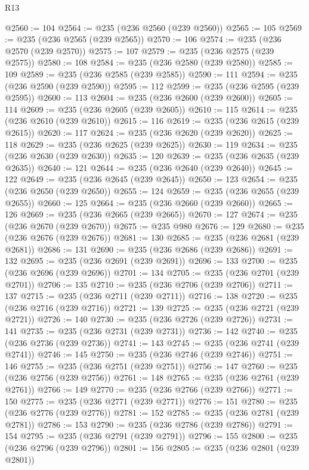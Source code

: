 \begin{lexlean}{R13}
\begin{coremodule}
@2560 := 104
@2564 := @235 (@236 @2560 (@239 @2560))
@2565 := 105
@2569 := @235 (@236 @2565 (@239 @2565))
@2570 := 106
@2574 := @235 (@236 @2570 (@239 @2570))
@2575 := 107
@2579 := @235 (@236 @2575 (@239 @2575))
@2580 := 108
@2584 := @235 (@236 @2580 (@239 @2580))
@2585 := 109
@2589 := @235 (@236 @2585 (@239 @2585))
@2590 := 111
@2594 := @235 (@236 @2590 (@239 @2590))
@2595 := 112
@2599 := @235 (@236 @2595 (@239 @2595))
@2600 := 113
@2604 := @235 (@236 @2600 (@239 @2600))
@2605 := 114
@2609 := @235 (@236 @2605 (@239 @2605))
@2610 := 115
@2614 := @235 (@236 @2610 (@239 @2610))
@2615 := 116
@2619 := @235 (@236 @2615 (@239 @2615))
@2620 := 117
@2624 := @235 (@236 @2620 (@239 @2620))
@2625 := 118
@2629 := @235 (@236 @2625 (@239 @2625))
@2630 := 119
@2634 := @235 (@236 @2630 (@239 @2630))
@2635 := 120
@2639 := @235 (@236 @2635 (@239 @2635))
@2640 := 121
@2644 := @235 (@236 @2640 (@239 @2640))
@2645 := 122
@2649 := @235 (@236 @2645 (@239 @2645))
@2650 := 123
@2654 := @235 (@236 @2650 (@239 @2650))
@2655 := 124
@2659 := @235 (@236 @2655 (@239 @2655))
@2660 := 125
@2664 := @235 (@236 @2660 (@239 @2660))
@2665 := 126
@2669 := @235 (@236 @2665 (@239 @2665))
@2670 := 127
@2674 := @235 (@236 @2670 (@239 @2670))
@2675 := @235 @980
@2676 := 129
@2680 := @235 (@236 @2676 (@239 @2676))
@2681 := 130
@2685 := @235 (@236 @2681 (@239 @2681))
@2686 := 131
@2690 := @235 (@236 @2686 (@239 @2686))
@2691 := 132
@2695 := @235 (@236 @2691 (@239 @2691))
@2696 := 133
@2700 := @235 (@236 @2696 (@239 @2696))
@2701 := 134
@2705 := @235 (@236 @2701 (@239 @2701))
@2706 := 135
@2710 := @235 (@236 @2706 (@239 @2706))
@2711 := 137
@2715 := @235 (@236 @2711 (@239 @2711))
@2716 := 138
@2720 := @235 (@236 @2716 (@239 @2716))
@2721 := 139
@2725 := @235 (@236 @2721 (@239 @2721))
@2726 := 140
@2730 := @235 (@236 @2726 (@239 @2726))
@2731 := 141
@2735 := @235 (@236 @2731 (@239 @2731))
@2736 := 142
@2740 := @235 (@236 @2736 (@239 @2736))
@2741 := 143
@2745 := @235 (@236 @2741 (@239 @2741))
@2746 := 145
@2750 := @235 (@236 @2746 (@239 @2746))
@2751 := 146
@2755 := @235 (@236 @2751 (@239 @2751))
@2756 := 147
@2760 := @235 (@236 @2756 (@239 @2756))
@2761 := 148
@2765 := @235 (@236 @2761 (@239 @2761))
@2766 := 149
@2770 := @235 (@236 @2766 (@239 @2766))
@2771 := 150
@2775 := @235 (@236 @2771 (@239 @2771))
@2776 := 151
@2780 := @235 (@236 @2776 (@239 @2776))
@2781 := 152
@2785 := @235 (@236 @2781 (@239 @2781))
@2786 := 153
@2790 := @235 (@236 @2786 (@239 @2786))
@2791 := 154
@2795 := @235 (@236 @2791 (@239 @2791))
@2796 := 155
@2800 := @235 (@236 @2796 (@239 @2796))
@2801 := 156
@2805 := @235 (@236 @2801 (@239 @2801))

\end{coremodule}
\end{lexlean}
